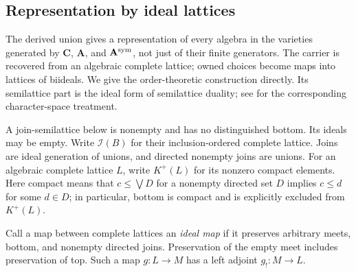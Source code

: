 \subsection{Representation by ideal lattices}\label{app:ideal-representation}

The derived union gives a representation of every algebra in the varieties
generated by $\mathbf C$, $\mathbf A$, and $\mathbf A^{\rm sym}$, not just of
their finite generators. The carrier is recovered from an algebraic complete
lattice; owned choices become maps into lattices of biideals. We give the
order-theoretic construction directly. Its semilattice part is the ideal
form of semilattice duality; see \cite[Section~2]{RomanowskaSmith2017} for
the corresponding character-space treatment.

A join-semilattice below is nonempty and has no distinguished bottom.
Its ideals may be empty. Write $\mathcal I(B)$ for their inclusion-ordered
complete lattice. Joins are ideal generation of unions, and directed
nonempty joins are unions. For an algebraic complete lattice $L$, write
$K^+(L)$ for its nonzero compact elements. Here compact means that
$c\leq\bigvee D$ for a nonempty directed set $D$ implies $c\leq d$ for
some $d\in D$; in particular, bottom is compact and is explicitly excluded
from $K^+(L)$.

Call a map between complete lattices an \emph{ideal map} if it preserves
arbitrary meets, bottom, and nonempty directed joins. Preservation of the
empty meet includes preservation of top. Such a map $g:L\to M$ has a
left adjoint $g_!:M\to L$.

